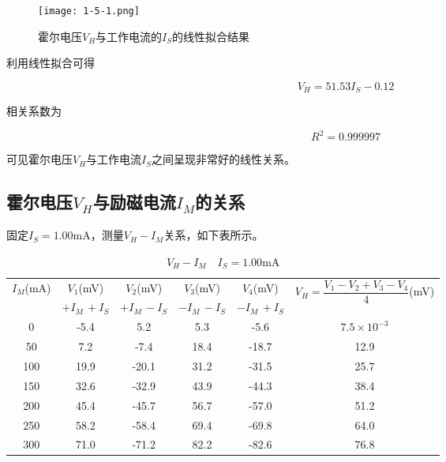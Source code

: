 \documentclass[12pt]{article}
\begin{document}
\begin{figure}[htbp]
    \centering
    \texttt{[image: 1-5-1.png]}
    \caption{霍尔电压$V_H$与工作电流的$I_S$的线性拟合结果}
\end{figure}

利用线性拟合可得

\[
    V_H=51.53I_S-0.12
\]

相关系数为

\[
    R^2=0.999997
\]

可见霍尔电压$V_H$与工作电流$I_S$之间呈现非常好的线性关系。

\subsection{霍尔电压$V_H$与励磁电流$I_M$的关系}
固定$I_S=1.00\mathrm{mA}$，测量$V_H-I_M$关系，如下表所示。
\begin{table}[htbp]
    \centering
    \caption{$V_H-I_M\quad I_S=1.00\mathrm{mA}$}
    \begin{tabular}{|c|c|c|c|c|c|}
    \hline
    \multirow{2}{*}{$I_M$(mA)} & $V_1$(mV)    & $V_2$(mV)    & $V_3$(mV)    & $V_4$(mV)    & \multirow{2}{*}{$V_H=\dfrac{V_1-V_2+V_3-V_4}{4}$(mV)} \\ \cline{2-5}
                               & $+I_M\,+I_S$ & $+I_M\,-I_S$ & $-I_M\,-I_S$ & $-I_M\,+I_S$ &                                                   \\ \hline
    0                          & -5.4         & 5.2          & 5.3          & -5.6         & $7.5\times10^{-3}$                                \\ \hline
    50                         & 7.2          & -7.4         & 18.4         & -18.7        & 12.9                                              \\ \hline
    100                        & 19.9         & -20.1        & 31.2         & -31.5        & 25.7                                              \\ \hline
    150                        & 32.6         & -32.9        & 43.9         & -44.3        & 38.4                                              \\ \hline
    200                        & 45.4         & -45.7        & 56.7         & -57.0        & 51.2                                              \\ \hline
    250                        & 58.2         & -58.4        & 69.4         & -69.8        & 64.0                                              \\ \hline
    300                        & 71.0         & -71.2        & 82.2         & -82.6        & 76.8                                              \\ \hline
    \end{tabular}
    \label{tab:VH}
\end{table}
\end{document}
